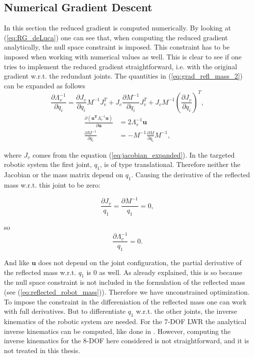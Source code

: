 \subsection{Numerical Gradient Descent}
\label{sec:numerical}


In this section the reduced gradient is computed numerically. By looking at (\ref{eq:RG_deLuca}) one can see that, when computing the reduced gradient  analytically, the null space constraint is imposed. This constraint has to be  imposed when working with numerical values as well. This is clear to see if one  tries to  implement the reduced gradient straightforward, i.e. with the original gradient w.r.t. the redundant joints.  The quantities in (\ref{eq:grad_refl_mass_2}) can be expanded as follows
\begin{equation}
\frac{\partial {\Lambda_{v}^{-1}}}{\partial {q_i}} = \frac{\partial {J_v}}{\partial {q_i}} M^{-1} J_v^T + J_v \frac{\partial {M^{-1}}}{\partial {q_i}} J_v^T + J_v M^{-1} \left ( \frac{\partial {J_v}}{\partial {q_i}} \right )^T  ,
\end{equation}
\begin{align}
\frac{\partial {(\mathbf{u^T} \Lambda_{v}^{-1} \mathbf{u})}}{\partial {\mathbf{u}}}& = 2 \Lambda_{v}^{-1} \mathbf{u} \\
\frac{\partial {M^{-1}}}{\partial {q_i}} & = -M^{-1} 
\frac{\partial {M}}{\partial {q_i}} M^{-1},
\end{align}


where $J_v$ comes from the equation (\ref{eq:jacobian_expanded}). In the targeted robotic system the first joint, $q_1$, is of type translational. Therefore neither  the Jacobian or the mass matrix depend on $q_1$. Causing the derivative of the reflected mass w.r.t. this joint to be zero:


\begin{equation}
\frac{\partial {{J_v}}}{q_1} = \frac{\partial {{M^{-1}}}}{q_1} = 0,
\label{eq:j_m_no__q1}
\end{equation}


so 
\begin{equation}
\frac{\partial {{\Lambda_{v}^{-1}}}}{q_1} = 0.
\end{equation}

And like $\mathbf{u}$ does not depend on the joint configuration, the partial derivative of the reflected mass w.r.t. $q_1$ is $0$ as well.
As already explained, this is so because the null space constraint is not included in the formulation of the reflected mass (see  (\ref{eq:reflected_robot_mass})). Therefore we have  unconstrained optimization.  
To impose the constraint in the differeniation of the reflected mass one can work with full derivatives. But to differentiate $q_1$ w.r.t. the other joints, the inverse kinematics of the robotic system are needed. For the 7-DOF LWR the analytical inverse kinematics can be computed, like done in \cite{analyticalInverseKinematicComputation}. However, computing the inverse kinematics for the 8-DOF here considered is not straightforward, and it is not treated in this thesis.


